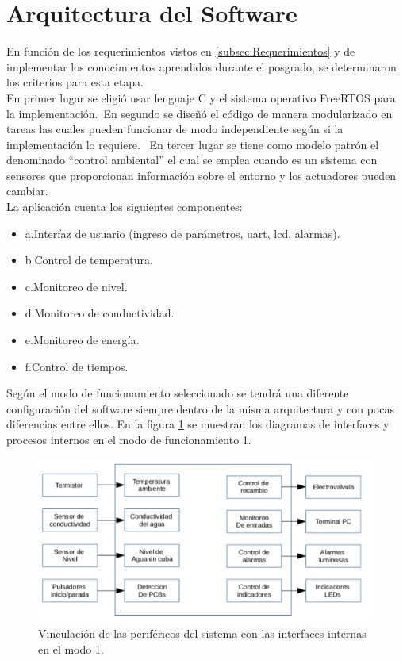 \section{ Arquitectura del Software }

En función de los requerimientos vistos en \ref{subsec:Requerimientos} y de implementar los conocimientos aprendidos durante el posgrado, se determinaron los criterios para esta etapa.\\ 
En primer lugar se eligió usar lenguaje C y el sistema operativo FreeRTOS para la implementación.\
En segundo se diseñó el código de manera modularizado en tareas las cuales pueden funcionar de modo independiente según si la implementación lo requiere. \
En tercer lugar se tiene como modelo patrón el denominado \enquote{control ambiental} el cual se emplea cuando es un sistema con sensores que proporcionan información sobre el entorno y los actuadores pueden cambiar.\\

La aplicación cuenta los siguientes componentes:
\begin{itemize}
\item a.Interfaz de usuario (ingreso de parámetros, uart, lcd, alarmas).
\item b.Control de temperatura.
\item c.Monitoreo de nivel.
\item d.Monitoreo de conductividad.
\item e.Monitoreo de energía.
\item f.Control de tiempos.
\end{itemize}

Según el modo de funcionamiento seleccionado se tendrá una diferente configuración del software siempre dentro de la misma arquitectura y con pocas diferencias entre ellos. En la figura \ref{fig:diag_interfaces_m1} se muestran los diagramas de interfaces y procesos internos en el modo de funcionamiento 1. 
\begin{figure}[h!]
	\centering
	\includegraphics[width=1.0\textwidth]{Figures/Cap_3/diagrama_interfaces_1}
	\caption{ Vinculación de las periféricos del sistema con las interfaces internas en el modo 1. }
	\label{fig:diag_interfaces_m1}
\end{figure}
 

